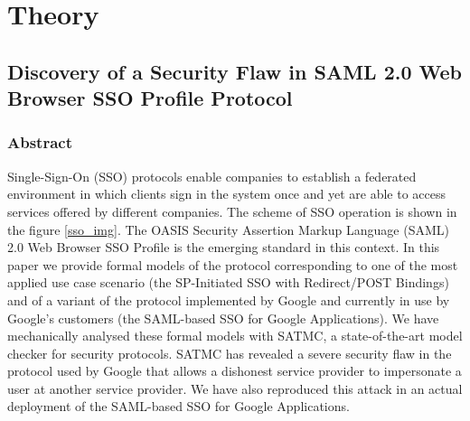 \documentclass[a4paper,12pt,oneside]{mybook}
\author{Sergey Sheff \\ \and Semen Strebelev}
\begin{document}
\setlength{\baselineskip}{.70cm}
\frontmatter

\maketitle
\clearpage

\pagestyle{\auxsettings}


\tableofcontents
\etocsettocstyle{}{} %
\clearpage

\pagestyle{\defaultsettings}
\mainmatter
\part{Theory}{}
\chapter{Discovery of a Security Flaw in SAML 2.0 Web Browser SSO Profile Protocol}


\section{Abstract}
Single-Sign-On (SSO) protocols enable companies to establish a federated environment in which clients sign in the system once and yet are able to access services offered by different companies. The scheme of SSO operation is shown in the figure \ref{sso_img}. The OASIS Security Assertion Markup Language (SAML) 2.0 Web Browser SSO Profile is the emerging standard in this context. In this paper we provide formal models of the protocol corresponding to one of the most applied use case scenario (the SP-Initiated SSO with Redirect/POST Bindings) and of a variant of the protocol implemented by Google and currently in use by Google’s customers (the SAML-based SSO for Google Applications). We have mechanically analysed these formal models with SATMC, a state-of-the-art model checker for security protocols. SATMC has revealed a severe security flaw in the protocol used by Google that allows a dishonest service provider to impersonate a user at another service provider. We have also reproduced this attack in an actual deployment of the SAML-based SSO for Google Applications.
\end{document}
